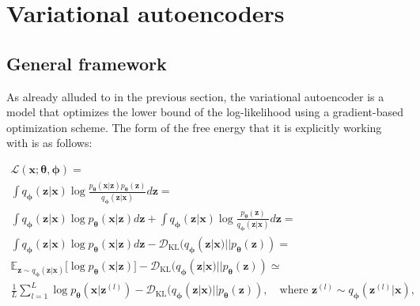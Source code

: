 \documentclass{report}
\begin{document}
\section{Variational autoencoders}

\subsection{General framework}

As already alluded to in the previous section, the variational autoencoder is a model that optimizes the lower bound of the log-likelihood using a gradient-based optimization scheme. The form of the free energy that it is explicitly working with is as follows:

\begin{equation}
\begin{gathered}
\mathcal{L}(\boldsymbol{x}; \boldsymbol{\theta}, \boldsymbol{\phi}) = \\
\int q_{\boldsymbol{\phi}}(\boldsymbol{z}|\boldsymbol{x}) \log \frac{p_{\boldsymbol{\theta}}(\boldsymbol{x} | \boldsymbol{z}) p_{\boldsymbol{\theta}}(\boldsymbol{z})}{q_{\boldsymbol{\phi}}(\boldsymbol{z}|\boldsymbol{x})} d \boldsymbol{z} = \\ 
\int q_{\boldsymbol{\phi}}(\boldsymbol{z}|\boldsymbol{x}) \log p_{\boldsymbol{\theta}}(\boldsymbol{x} | \boldsymbol{z}) d \boldsymbol{z} + \int q_{\boldsymbol{\phi}}(\boldsymbol{z}|\boldsymbol{x}) \log \frac{p_{\boldsymbol{\theta}}(\boldsymbol{z})}{q_{\boldsymbol{\phi}}(\boldsymbol{z}|\boldsymbol{x})} d \boldsymbol{z}  = \\
\int q_{\boldsymbol{\phi}}(\boldsymbol{z}|\boldsymbol{x}) \log p_{\boldsymbol{\theta}}(\boldsymbol{x} | \boldsymbol{z}) d \boldsymbol{z} - \mathcal{D}_\text{KL}(q_{\boldsymbol{\phi}}(\boldsymbol{z}|\boldsymbol{x}) || p_{\boldsymbol{\theta}}(\boldsymbol{z})) = \\
\mathbb{E}_{\boldsymbol{z} \sim q_{\boldsymbol{\phi}}(\boldsymbol{z}|\boldsymbol{x})} \big[ \log p_{\boldsymbol{\theta}} (\boldsymbol{x} | \boldsymbol{z}) \big] - \mathcal{D}_\text{KL}(q_{\boldsymbol{\phi}}(\boldsymbol{z}|\boldsymbol{x}) || p_{\boldsymbol{\theta}}(\boldsymbol{z})) \simeq \\
\frac{1}{L} \sum_{l=1}^L \log p_{\boldsymbol{\theta}} (\boldsymbol{x} | \boldsymbol{z}^{(l)}) - \mathcal{D}_\text{KL}(q_{\boldsymbol{\phi}}(\boldsymbol{z}|\boldsymbol{x}) || p_{\boldsymbol{\theta}}(\boldsymbol{z})), \quad \text{where } \boldsymbol{z}^{(l)} \sim q_{\boldsymbol{\phi}}(\boldsymbol{z}^{(l)} | \boldsymbol{x}),
\end{gathered}
\label{eq:vae-lb}
\end{equation}
\end{document}
